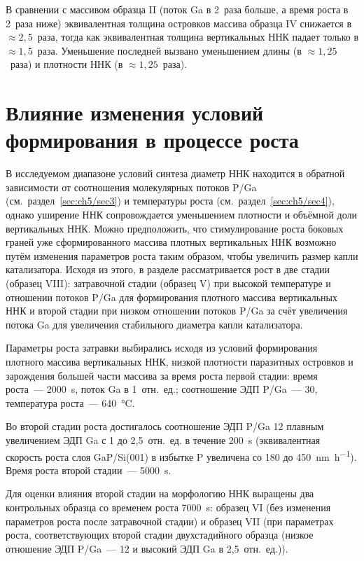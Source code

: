 В сравнении с массивом образца II (поток Ga в 2~раза больше, а время роста в
2~раза ниже) эквивалентная толщина островков массива образца IV снижается в
\(\approx 2,5\)~раза, тогда как эквивалентная толщина вертикальных ННК падает
только в \(\approx 1,5\)~раза. Уменьшение последней вызвано уменьшением длины
(в \(\approx 1,25\)~раза) и плотности ННК (в \(\approx 1,25\)~раза).

\section{Влияние изменения условий формирования в процессе роста}\label{sec:ch5/sec6}

В исследуемом диапазоне условий синтеза диаметр ННК находится в обратной
зависимости от соотношения молекулярных потоков P/Ga
(см.~раздел~\cref{sec:ch5/sec3}) и температуры роста
(см.~раздел~\cref{sec:ch5/sec4}), однако уширение ННК сопровождается
уменьшением плотности и объёмной доли вертикальных ННК. Можно предположить, что
стимулирование роста боковых граней уже сформированного массива плотных
вертикальных ННК возможно путём изменения параметров роста таким образом, чтобы
увеличить размер капли катализатора. Исходя из этого, в разделе рассматривается
рост в две стадии (образец VIII): затравочной стадии (образец V) при высокой
температуре и отношении потоков P/Ga для формирования плотного массива
вертикальных ННК и второй стадии при низком отношении потоков P/Ga за счёт
увеличения потока Ga для увеличения стабильного диаметра капли катализатора.

Параметры роста затравки выбирались исходя из условий формирования плотного
массива вертикальных ННК, низкой плотности паразитных островков и зарождения
большей части массива за время роста первой стадии: время роста~---
2000~\si{\second}, поток Ga в 1~отн.~ед.; соотношение ЭДП P/Ga~--- 30,
температура роста~--- 640~\si{\degreeCelsius}.

Во второй стадии роста  достигалось соотношение ЭДП P/Ga 12 плавным увеличением
ЭДП Ga с 1 до 2,5~отн.~ед. в течение 200~\si{\second} (эквивалентная скорость
роста слоя GaP/Si(001) в избытке P увеличена со 180 до
450~\si{\nano\meter\per\hour}). Время роста второй стадии~---
5000~\si{\second}.

Для оценки влияния второй стадии на морфологию ННК выращены два контрольных
образца со временем роста 7000~\si{\second}: образец VI (без изменения
параметров роста после затравочной стадии) и образец VII (при параметрах роста,
соответствующих второй стадии двухстадийного образца (низкое отношение ЭДП
P/Ga~--- 12 и высокий ЭДП Ga в 2,5~отн.~ед.)).

